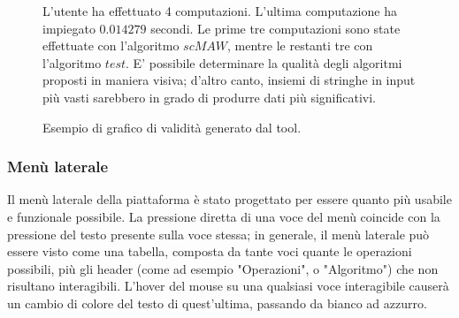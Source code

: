\begin{figure}[ht!]
    \centering
    \caption{L'utente ha effettuato 4 computazioni. L'ultima computazione ha impiegato $0.014279$ secondi. Le prime tre computazioni sono state effettuate con l'algoritmo $scMAW$, mentre le restanti tre con l'algoritmo $test$. E' possibile determinare la qualità degli algoritmi proposti in maniera visiva; d'altro canto, insiemi di stringhe in input più vasti sarebbero in grado di produrre dati più significativi.}
    \label{fig:esempio}
\end{figure}

\begin{figure}[ht!]
    \centering
    \caption{Esempio di grafico di validità generato dal tool.}
    \label{fig:esempio}
\end{figure}

\newpage

\subsubsection{Menù laterale}

Il menù laterale della piattaforma è stato progettato per essere quanto più usabile e funzionale possibile. La pressione diretta di una voce del menù coincide con la pressione del testo presente sulla voce stessa; in generale, il menù laterale può essere visto come una tabella, composta da tante voci quante le operazioni possibili, più gli header (come ad esempio "Operazioni", o "Algoritmo") che non risultano interagibili. L'hover del mouse su una qualsiasi voce interagibile causerà un cambio di colore del testo di quest'ultima, passando da bianco ad azzurro.

